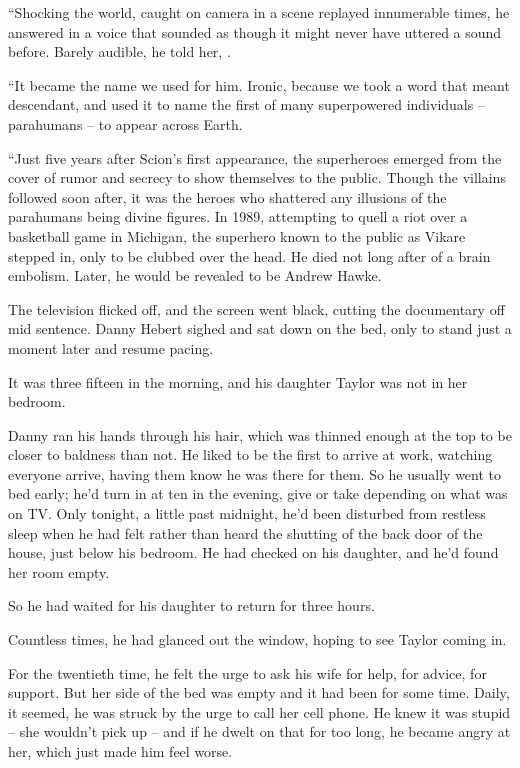 “Shocking the world, caught on camera in a scene replayed innumerable times, he answered in a voice that sounded as though it might never have uttered a sound before. Barely audible, he told her, .

“It became the name we used for him. Ironic, because we took a word that meant descendant, and used it to name the first of many superpowered individuals -- parahumans -- to appear across Earth.

“Just five years after Scion's first appearance, the superheroes emerged from the cover of rumor and secrecy to show themselves to the public. Though the villains followed soon after, it was the heroes who shattered any illusions of the parahumans being divine figures. In 1989, attempting to quell a riot over a basketball game in Michigan, the superhero known to the public as Vikare stepped in, only to be clubbed over the head. He died not long after of a brain embolism. Later, he would be revealed to be Andrew Hawke.


The television flicked off, and the screen went black, cutting the documentary off mid sentence. Danny Hebert sighed and sat down on the bed, only to stand just a moment later and resume pacing.

It was three fifteen in the morning, and his daughter Taylor was not in her bedroom.

Danny ran his hands through his hair, which was thinned enough at the top to be closer to baldness than not. He liked to be the first to arrive at work, watching everyone arrive, having them know he was there for them. So he usually went to bed early; he'd turn in at ten in the evening, give or take depending on what was on TV. Only tonight, a little past midnight, he'd been disturbed from restless sleep when he had felt rather than heard the shutting of the back door of the house, just below his bedroom. He had checked on his daughter, and he'd found her room empty.

So he had waited for his daughter to return for three hours.

Countless times, he had glanced out the window, hoping to see Taylor coming in.

For the twentieth time, he felt the urge to ask his wife for help, for advice, for support. But her side of the bed was empty and it had been for some time. Daily, it seemed, he was struck by the urge to call her cell phone. He knew it was stupid -- she wouldn't pick up -- and if he dwelt on that for too long, he became angry at her, which just made him feel worse.

